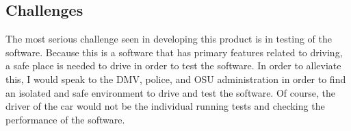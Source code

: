 \documentclass[12pt]{article}
\begin{document}
\subsection{Challenges}
The most serious challenge seen in developing this product is in testing of the software. Because this is a software that has primary features related to driving, a safe place is needed to drive in order to test the software. In order to alleviate this, I would speak to the DMV, police, and OSU administration in order to find an isolated and safe environment to drive and test the software. Of course, the driver of the car would not be the individual running tests and checking the performance of the software.




\end{document}

